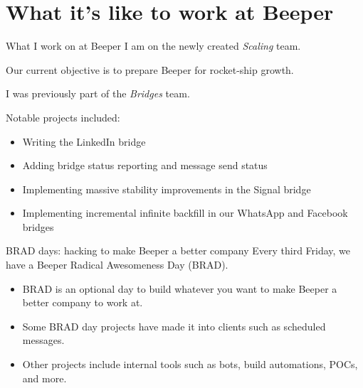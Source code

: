 \documentclass{beeper}
\begin{document}
\section{What it's like to work at Beeper}

\begin{frame}{What I work on at Beeper}
    I am on the newly created \textit{Scaling} team.

    Our current objective is to prepare Beeper for rocket-ship growth.
    \vspace{0.5cm}
    \pause

    I was previously part of the \textit{Bridges} team. 

    Notable projects included:
    \begin{itemize}
        \item Writing the LinkedIn bridge
        \item Adding bridge status reporting and message send status
        \item Implementing massive stability improvements in the Signal bridge
        \item Implementing incremental infinite backfill in our WhatsApp and
            Facebook bridges
    \end{itemize}
\end{frame}

\begin{frame}{BRAD days: hacking to make Beeper a better company}
    Every third Friday, we have a Beeper Radical Awesomeness Day (BRAD).

    \begin{itemize}
        \item  BRAD is an optional day to build whatever you want to make Beeper
            a better company to work at.
        \item Some BRAD day projects have made it into clients such as scheduled
            messages.
        \item Other projects include internal tools such as bots, build
            automations, POCs, and more.
    \end{itemize}
\end{frame}
\end{document}
